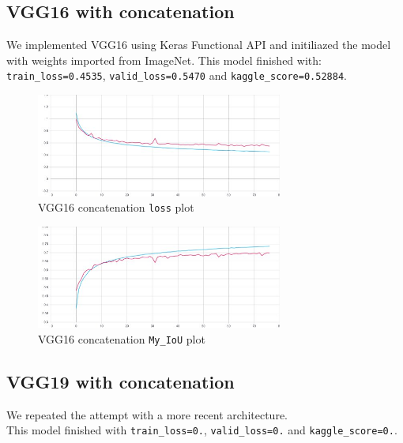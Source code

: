 \documentclass{article}
\begin{document}
		\subsection{VGG16 with concatenation}
					
			We implemented VGG16 using Keras Functional API and initiliazed the model with weights imported from ImageNet. This model finished with: \\ \texttt{train\_loss=0.4535}, \texttt{valid\_loss=0.5470} and \texttt{kaggle\_score=0.52884}.
		
			\begin{figure}[H]
				\centering
				\includegraphics[height=3.4cm, keepaspectratio]{Trans_Lear_VGG16_Conc_Dec16_04-04-00_loss}
				\caption{VGG16 concatenation \texttt{loss} plot}
			\end{figure}
	
			\begin{figure}[H]
				\centering
				\includegraphics[height=3.4cm, keepaspectratio]{Trans_Lear_VGG16_Conc_Dec16_04-04-00_my_IoU}
				\caption{VGG16 concatenation \texttt{My\_IoU} plot}
			\end{figure}
		
		\subsection{VGG19 with concatenation}
		
			We repeated the attempt with a more recent architecture. \\
			
			This model finished with \texttt{train\_loss=0.}, \texttt{valid\_loss=0.} and \texttt{kaggle\_score=0.}.
			
	
\end{document}
